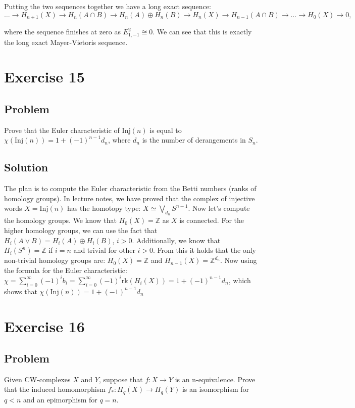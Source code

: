 \documentclass{article}
\begin{document}
Putting the two sequences together we have a long exact sequence:
\begin{equation*}
\dots \to H_{n+1}(X) \to H_{n}(A \cap B) \to H_{n}(A) \oplus H_{n}(B) \to H_n(X) \to H_{n-1}(A \cap B) \to \dots \to H_0(X) \to 0,
\end{equation*}

where the sequence finishes at zero as $E^2_{1,-1} \cong 0$. We can see that this is exactly the long exact Mayer-Vietoris sequence.

\newpage
\section*{Exercise 15}
\subsection*{Problem}
Prove that the Euler characteristic of $\mathrm{Inj}(n)$ is equal to
$\chi(\mathrm{Inj}(n)) = 1 + (-1)^{n-1} d_n$,
where $d_n$ is the number of derangements in $S_n$.
\subsection*{Solution}
The plan is to compute the Euler characteristic from the Betti numbers (ranks of homology groups).
In lecture notes, we have proved that the complex of injective words
$X = \mathrm{Inj}(n)$ has the homotopy type:
$X \simeq \bigvee_{d_n} S^{n-1}$.
Now let's compute the homology groups.
We know that $H_0(X) = \mathbb{Z}$ as $X$ is connected.
For the higher homology groups, we can use the fact that
$H_i (A \vee B) = H_i(A) \oplus H_i(B)$, $i>0$. Additionally, we know that $H_i (S^n) = \mathbb{Z}$ if $i=n$ and trivial for other $i>0$.
From this it holds that the only non-trivial homology groups are:
$H_0(X) = \mathbb{Z}$ and $H_{n-1}(X) = \mathbb{Z}^{d_n}$.
Now using the formula for the Euler characteristic:
$\chi = \sum_{i=0}^\infty (-1)^i b_i = \sum_{i=0}^\infty (-1)^i \mathrm{rk}(H_i(X)) = 1 + (-1)^{n-1} d_n$,
which shows that $\chi(\mathrm{Inj}(n)) = 1+(-1)^{n-1} d_n$
\newpage
\section*{Exercise 16}
\subsection*{Problem}
Given CW-complexes $X$ and $Y$, suppose that $f: X \to Y$ is an
n-equivalence. Prove that the induced homomorphism $f_*: H_q(X) \to H_q(Y)$ is an isomorphism for $q < n$ and an epimorphism for $q=n$.
\end{document}

